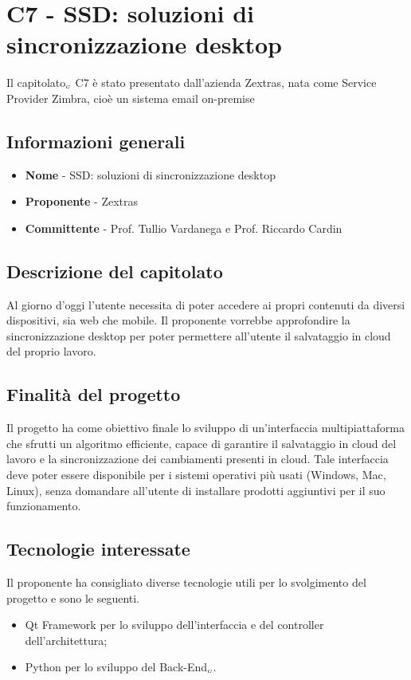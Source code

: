 \chapter{C7 - SSD: soluzioni di sincronizzazione desktop}
\label{CapitolatoC7}
Il capitolato$_{\scaleto{G}{3pt}}$ C7 è stato presentato dall'azienda Zextras, nata come Service Provider Zimbra, cioè un sistema email on-premise
\section{Informazioni generali} \label{C7InformazioniGenerali}
\begin{itemize}
	\item \textbf{Nome} - SSD: soluzioni di sincronizzazione desktop
	\item \textbf{Proponente} - Zextras
	\item \textbf{Committente} - Prof. Tullio Vardanega e Prof. Riccardo Cardin
\end{itemize}
\section{Descrizione del capitolato} \label{C7DescrizioneDelCapitolato}
Al giorno d'oggi l'utente necessita di poter accedere ai propri contenuti da diversi dispositivi, sia web che mobile. Il proponente vorrebbe approfondire la sincronizzazione desktop per poter permettere all'utente il salvataggio in cloud del proprio lavoro.
\section{Finalità del progetto} \label{C7FinalitàDelProgetto}
Il progetto ha come obiettivo finale lo sviluppo di un'interfaccia multipiattaforma che sfrutti un algoritmo efficiente, capace di garantire il salvataggio in cloud del lavoro e la sincronizzazione dei cambiamenti presenti in cloud. Tale interfaccia deve poter essere disponibile per i sistemi operativi più usati (Windows, Mac, Linux), senza domandare all'utente di installare prodotti aggiuntivi per il suo funzionamento. 
\section{Tecnologie interessate} \label{C7TecnologieInteressate}
Il proponente ha consigliato diverse tecnologie utili per lo svolgimento del progetto e sono le seguenti.
\begin{itemize}
	\item Qt Framework per lo sviluppo dell'interfaccia e del controller dell'architettura;
	\item Python per lo sviluppo del Back-End$_{\scaleto{G}{3pt}}$.
\end{itemize}
